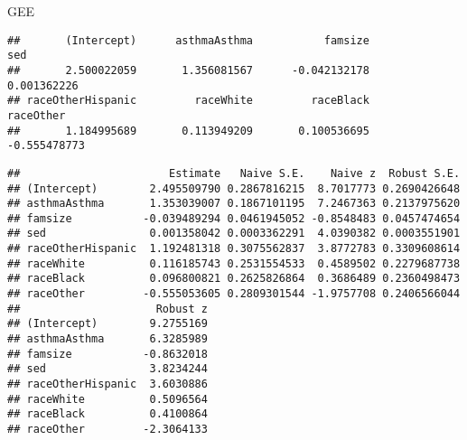 \begin{frame}[fragile]{GEE}

\tiny

\begin{verbatim}
##       (Intercept)      asthmaAsthma           famsize               sed 
##       2.500022059       1.356081567      -0.042132178       0.001362226 
## raceOtherHispanic         raceWhite         raceBlack         raceOther 
##       1.184995689       0.113949209       0.100536695      -0.555478773
\end{verbatim}

\begin{verbatim}
##                       Estimate   Naive S.E.    Naive z  Robust S.E.
## (Intercept)        2.495509790 0.2867816215  8.7017773 0.2690426648
## asthmaAsthma       1.353039007 0.1867101195  7.2467363 0.2137975620
## famsize           -0.039489294 0.0461945052 -0.8548483 0.0457474654
## sed                0.001358042 0.0003362291  4.0390382 0.0003551901
## raceOtherHispanic  1.192481318 0.3075562837  3.8772783 0.3309608614
## raceWhite          0.116185743 0.2531554533  0.4589502 0.2279687738
## raceBlack          0.096800821 0.2625826864  0.3686489 0.2360498473
## raceOther         -0.555053605 0.2809301544 -1.9757708 0.2406566044
##                     Robust z
## (Intercept)        9.2755169
## asthmaAsthma       6.3285989
## famsize           -0.8632018
## sed                3.8234244
## raceOtherHispanic  3.6030886
## raceWhite          0.5096564
## raceBlack          0.4100864
## raceOther         -2.3064133
\end{verbatim}

\end{frame}

